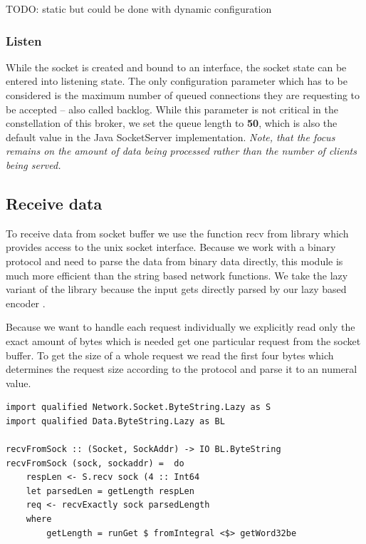 TODO: static but could be done with dynamic configuration

\subsubsection{Listen}

While the socket is created and bound to an interface, the socket state can be
entered into listening state. The only configuration parameter which has to be
considered is the maximum number of queued connections they are requesting to
be accepted -- also called backlog. While this parameter is not critical in the
constellation of this broker, we set the queue length to \textbf{50}, which is
also the default value in the Java SocketServer implementation. \textit{Note,
that the focus remains on the amount of data being processed rather than the
number of clients being served.}

\subsection{Receive data}
To receive data from socket buffer we use the function recv from
library which provides access to the unix socket interface. Because we work
with a binary protocol and need to parse the data from binary data directly,
this module is much more efficient than the string based network functions. We
take the lazy variant of the library because the input gets directly parsed by
our lazy based encoder .

Because we want to handle each request individually we explicitly read
only the exact amount of bytes which is needed get one particular request from
the socket buffer. To get the size of a whole request we read the first four
bytes which determines the request size according to the protocol and parse it
to an numeral value.

\begin{lstlisting}
import qualified Network.Socket.ByteString.Lazy as S 
import qualified Data.ByteString.Lazy as BL

recvFromSock :: (Socket, SockAddr) -> IO BL.ByteString
recvFromSock (sock, sockaddr) =  do 
    respLen <- S.recv sock (4 :: Int64
    let parsedLen = getLength respLen
    req <- recvExactly sock parsedLength 
    where
        getLength = runGet $ fromIntegral <$> getWord32be
\end{lstlisting}

